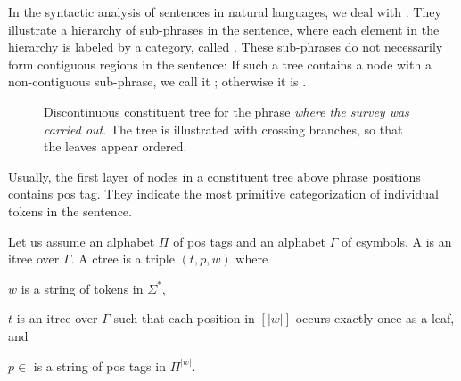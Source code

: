 \documentclass[../document.tex]{subfiles}
\begin{document}
    In the syntactic analysis of sentences in natural languages, we deal with .
    They illustrate a hierarchy of sub-phrases in the sentence, where each element in the hierarchy is labeled by a category, called .
    These sub-phrases do not necessarily form contiguous regions in the sentence:
    If such a tree contains a node with a non-contiguous sub-phrase, we call it ; otherwise it is .

    \begin{figure}
        \null\hfill
        
%        
        \hfill\null

        \caption{\label{fig:pre:ctree}
            Discontinuous constituent tree for the phrase \emph{where the survey was carried out}.
            The tree is illustrated with crossing branches, so that the leaves appear ordered.
        }
    \end{figure}

    Usually, the first layer of nodes in a constituent tree above phrase positions contains \gls{pos} tag.
    They indicate the most primitive categorization of individual tokens in the sentence.

    Let us assume an \gls*{alphabet} \(\varPi\) of \gls*{pos} tags and an \gls*{alphabet} \(\varGamma\) of \glspl{csymbol}.
    A  is an \gls{itree} over \(\varGamma\).
    A \gls{ctree} is a triple \((t, p, w)\) where
    \begin{compactitem}
        \item \(w\) is a \gls*{string} of tokens in \(\varSigma^*\),
        \item \(t\) is an \gls*{itree} over \(\varGamma\) such that each position in \([|w|]\) occurs exactly once as a leaf, and
        \item \(p \in \) is a \gls*{string} of \gls*{pos} tags in \(\varPi^{|w|}\).
    \end{compactitem}
%
\end{document}

